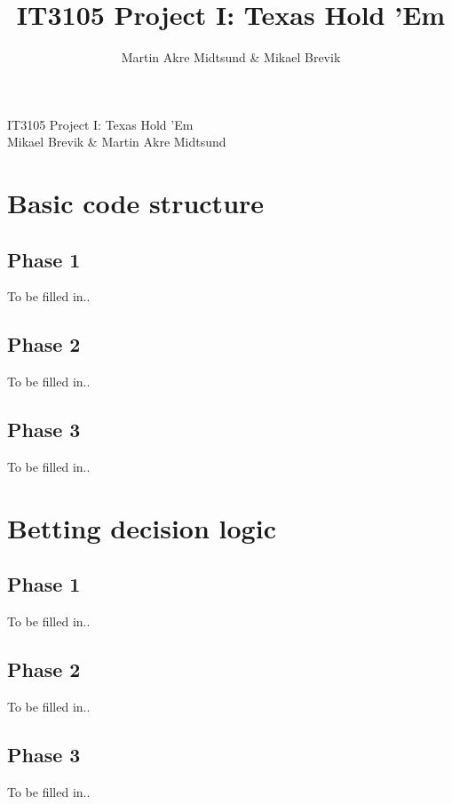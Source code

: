 \documentclass[a4paper, 12pt]{article}
\title{IT3105 Project I: Texas Hold 'Em}
\author{Martin Akre Midtsund & Mikael Brevik}
\begin{document}
\begin{titlepage}

	\begin{center}
		{ \LARGE IT3105 Project I: Texas Hold 'Em }\\[1.5cm]

		{ \Large Mikael Brevik \& Martin Akre Midtsund }\\[0.5cm]

	\end{center}

\end{titlepage}

\newpage

\tableofcontents
\listoffigures
\listoftables
\thispagestyle{fancy}
\newpage


\section{Basic code structure}

\subsection{Phase 1}
To be filled in..

\subsection{Phase 2}
To be filled in..

\subsection{Phase 3}
To be filled in..

\section{Betting decision logic}

\subsection{Phase 1}
To be filled in..

\subsection{Phase 2}
To be filled in..

\subsection{Phase 3}
To be filled in..
\end{document}
